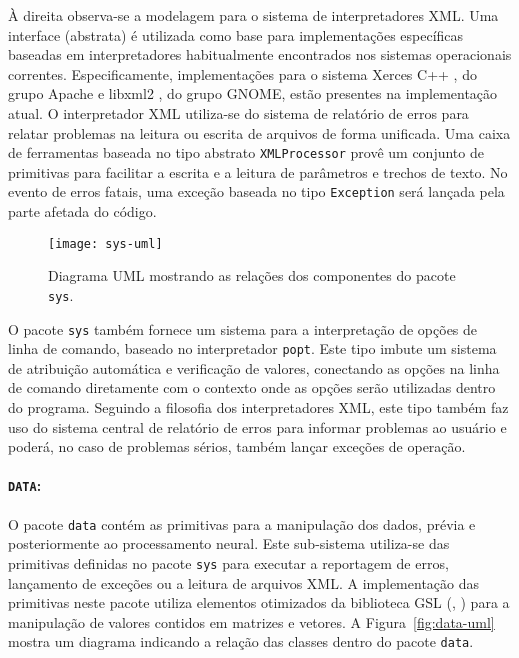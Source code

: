 À direita observa-se a modelagem para o sistema de interpretadores XML. Uma
interface (abstrata) é utilizada como base para implementações específicas
baseadas em interpretadores habitualmente encontrados nos sistemas
operacionais correntes. Especificamente, implementações para o sistema Xerces
C++ \cite{xerces-c}, do grupo Apache e libxml2 \cite{libxml2}, do grupo GNOME,
estão presentes na implementação atual. O interpretador XML utiliza-se do
sistema de relatório de erros para relatar problemas na leitura ou escrita de
arquivos de forma unificada. Uma caixa de ferramentas baseada no tipo abstrato
\texttt{XMLProcessor} provê um conjunto de primitivas para facilitar a escrita
e a leitura de parâmetros e trechos de texto. No evento de erros fatais, uma
exceção baseada no tipo \texttt{Exception} será lançada pela parte afetada do
código.

\begin{figure}
\begin{center}
\texttt{[image: sys-uml]}
\end{center}
\caption{Diagrama UML mostrando as relações dos componentes do pacote
\texttt{sys}.}
\label{fig:sys-uml}
\end{figure}

O pacote \texttt{sys} também fornece um sistema para a interpretação de opções
de linha de comando, baseado no interpretador \texttt{popt}. Este tipo imbute
um sistema de atribuição automática e verificação de valores, conectando as
opções na linha de comando diretamente com o contexto onde as opções serão
utilizadas dentro do programa. Seguindo a filosofia dos interpretadores XML,
este tipo também faz uso do sistema central de relatório de erros para
informar problemas ao usuário e poderá, no caso de problemas sérios, também
lançar exceções de operação.

\paragraph{\texttt{DATA}:} O pacote \texttt{data} contém as primitivas para a
manipulação dos dados, prévia e posteriormente ao processamento neural. Este
sub-sistema utiliza-se das primitivas definidas no pacote \texttt{sys} para
executar a reportagem de erros, lançamento de exceções ou a leitura de
arquivos XML. A implementação das primitivas neste pacote utiliza elementos
otimizados da biblioteca GSL (, \cite{gsl}) para a
manipulação de valores contidos em matrizes e vetores. A
Figura~\ref{fig:data-uml} mostra um diagrama indicando a relação das classes
dentro do pacote \texttt{data}.

